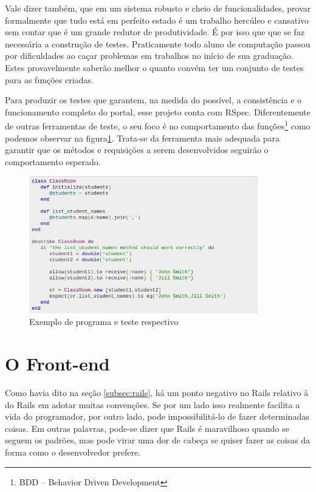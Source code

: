 Vale dizer também, que em um sistema robusto e cheio de funcionalidades, provar
formalmente que tudo está em perfeito estado é um trabalho hercúleo e cansativo
sem contar que é um grande redutor de produtividade. É por isso que que se faz
necessária a construção de testes. Praticamente todo aluno de computação passou
por dificuldades ao caçar problemas em trabalhos no início de sua graduação.
Estes provavelmente saberão melhor o quanto convém ter um conjunto de testes
para as funções criadas.

Para produzir os testes que garantem, na medida do possível, a consistência e o
funcionamento completo do portal, esse projeto conta com RSpec. Diferentemente de
outras ferramentas de teste, o seu foco é no comportamento das funções\footnote{
BDD -- Behavior Driven Development} como podemos observar na figura\ref{fig:rspec}.
Trata-se da ferramenta mais adequada para garantir que os métodos e requisições a
serem desenvolvidos seguirão o comportamento esperado.

\begin{figure}[htb]
    \centering
    \includegraphics[width=10cm]{figuras/rspec}
    \caption{\label{fig:rspec} Exemplo de programa e teste respectivo}
\end{figure}

\section{O Front-end}
\label{sec:front-end}

Como havia dito na seção \ref{subsec:rails}, há um ponto negativo no Rails relativo à
 do Rails em adotar muitas convenções. Se por um lado isso realmente facilita
a vida do programador, por outro lado, pode impossibilitá-lo de fazer determinadas coisas.
Em outras palavras, pode-se dizer que Rails é maravilhoso quando se seguem os padrões, mas
pode virar uma dor de cabeça se quiser fazer as coisas da forma como o desenvolvedor
prefere.

